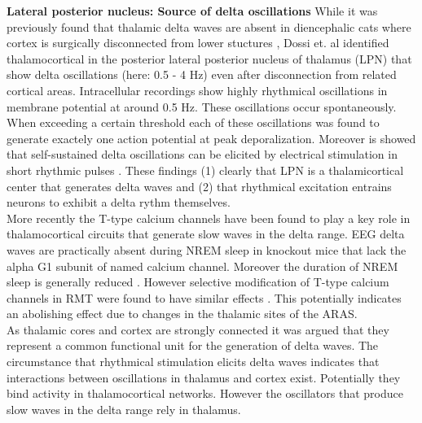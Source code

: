 \textbf{Lateral posterior nucleus: Source of delta oscillations}
While it was previously found that thalamic delta waves are absent in diencephalic cats where cortex is surgically disconnected from lower stuctures \parencite{villablanca2004counterpointing}, Dossi et. al \parencite*{dossi1992electrophysiology} identified thalamocortical in the posterior lateral posterior nucleus of thalamus (LPN) that show delta oscillations (here: 0.5 - 4 Hz) even after disconnection from related cortical areas. Intracellular recordings show highly rhythmical oscillations in membrane potential at around 0.5 Hz. These oscillations occur spontaneously. When exceeding a certain threshold each of these oscillations was found to generate exactely one action potential at peak deporalization. Moreover is showed that self-sustained delta oscillations can be elicited by electrical stimulation in short rhythmic pulses \parencite{dossi1992electrophysiology}. These findings (1) clearly that LPN is a thalamicortical center that generates delta waves and (2) that rhythmical excitation entrains neurons to exhibit a delta rythm themselves.\\
 More recently the T-type calcium channels have been found to play a key role in thalamocortical circuits that generate slow waves in the delta range. EEG delta waves are practically absent during NREM sleep in knockout mice that lack the alpha G1 subunit of named calcium channel. Moreover the duration of NREM sleep is generally reduced \parencite{lee2004lack}. However selective modification of T-type calcium channels in RMT were found to have similar effects \parencite{brown2012control}. This potentially indicates an abolishing effect due to changes in the thalamic sites of the ARAS.\\
As thalamic cores and cortex are strongly connected it was argued that they represent a common functional unit for the generation of delta waves. The circumstance that rhythmical stimulation elicits delta waves indicates that interactions between oscillations in thalamus and cortex exist. Potentially they bind activity in thalamocortical networks. However the oscillators that produce slow waves in the delta range rely in thalamus.\\


